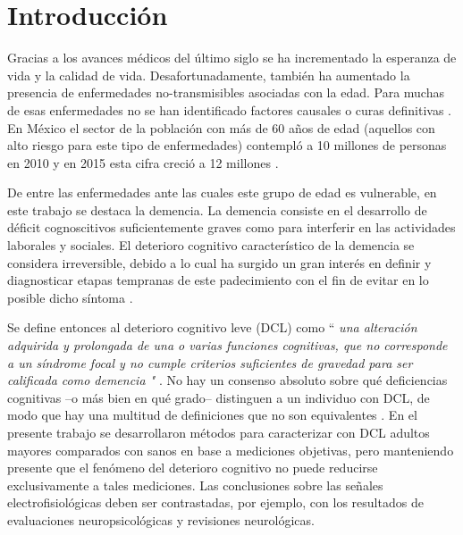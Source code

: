 
\chapter{Introducción}

Gracias a los avances médicos del último siglo se ha incrementado la esperanza de vida y la 
calidad de vida. Desafortunadamente, también ha aumentado la presencia de enfermedades 
no-transmisibles asociadas con la edad. 
%
Para muchas de esas enfermedades no se han identificado factores causales o curas definitivas 
\cite{PlanAlzheimer04}.
%
En México el sector de la población con más de 60 años de edad (aquellos con alto riesgo para este
tipo de enfermedades) contempló a 10 millones de personas en 2010 y en 2015 esta cifra 
creció a 12 millones \cite{Censo10,Intercensal15}.

De entre las enfermedades ante las cuales este grupo de edad es vulnerable, en este trabajo se 
destaca la demencia. 
%
La demencia consiste en el desarrollo de déficit cognoscitivos suficientemente graves como para 
interferir en las actividades laborales y sociales.
%
El deterioro cognitivo característico de la demencia se considera irreversible, debido a lo cual 
ha surgido un gran interés en definir y diagnosticar etapas tempranas de este padecimiento con el 
fin de evitar en lo posible dicho síntoma \cite{Knopman01}.

Se define entonces al deterioro cognitivo leve (DCL) como ``\textit{ una alteración adquirida y 
prolongada de una o varias funciones cognitivas, que no corresponde a un síndrome focal y no cumple 
criterios suficientes de gravedad para ser calificada como demencia "} \cite{Robles02}.
%
No hay un consenso absoluto sobre qué deficiencias cognitivas --o más bien en qué grado-- 
distinguen a un individuo con DCL, de modo que hay una multitud de definiciones que no son
equivalentes \cite{Petersen01}.
%
En el presente trabajo se desarrollaron métodos para caracterizar con DCL adultos mayores comparados 
con sanos en base a mediciones objetivas, pero manteniendo presente que el fenómeno del deterioro 
cognitivo no puede reducirse exclusivamente a tales mediciones. Las conclusiones sobre las señales
electrofisiológicas deben ser contrastadas, por ejemplo, con los resultados de evaluaciones 
neuropsicológicas y revisiones neurológicas.

